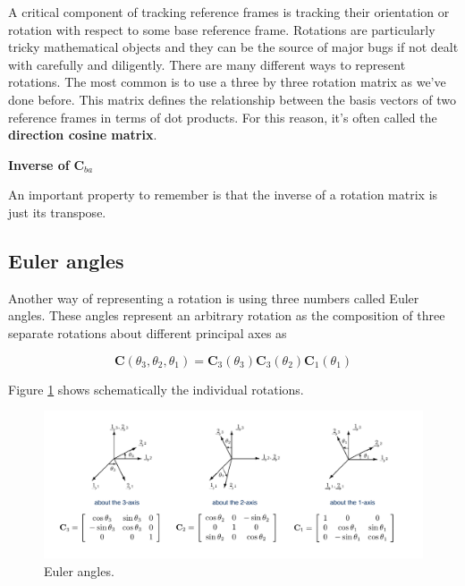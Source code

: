 A critical component of tracking
reference frames is tracking their orientation or rotation with
respect to some base reference frame. Rotations are particularly tricky
mathematical objects and they can be the source of major bugs if not
dealt with carefully and diligently. There are many different ways
to represent rotations. The most common is to use a three by three rotation matrix
as we've done before. This matrix defines
the relationship between the basis vectors of two reference
frames in terms of dot products. For this reason, it's often called
the \textbf{direction cosine matrix}.


\begin{framed}
\theoremstyle{remark}
\begin{remark}{\textbf{Inverse of} $\mathbf{C}_{ba}$}

An important property to
remember is that the inverse of a rotation matrix
is just its transpose.
\end{remark}
\end{framed}

\subsection{Euler angles}
\label{euler_angles}

Another way of representing a rotation is using three numbers
called Euler angles. These angles represent an arbitrary
rotation as the composition of three separate rotations about
different principal axes as 

\begin{equation}
\mathbf{C}(\theta_3, \theta_2, \theta_1) = \mathbf{C}_3(\theta_3)\mathbf{C}_3(\theta_2)\mathbf{C}_1(\theta_1) 
\end{equation}


Figure \ref{coordinate_rotations_4} shows schematically the individual rotations. 

\begin{figure}[!htb]
\begin{center}
\includegraphics[scale=0.310]{img/coordinate_transforms/coordinate_rotations_4.jpeg}
\end{center}
\caption{Euler angles.}
\label{coordinate_rotations_4}
\end{figure}

